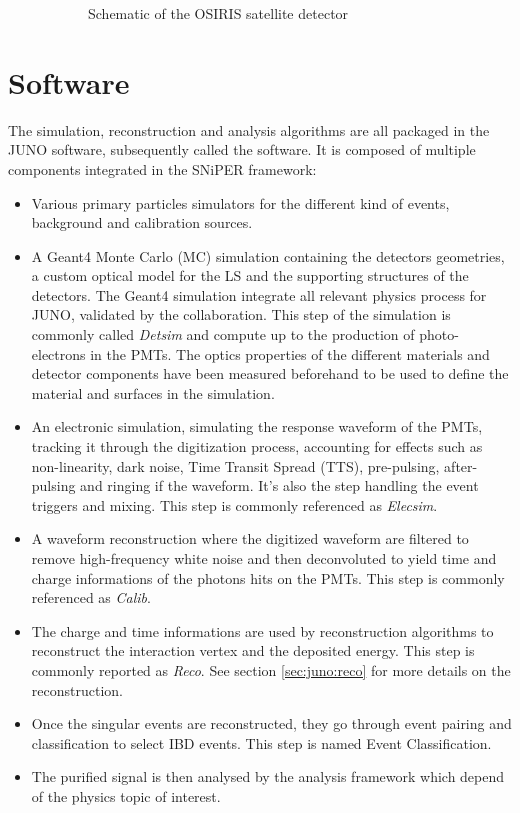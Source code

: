 \documentclass[../main.tex]{subfiles}
\begin{document}
\begin{figure}[ht]
\begin{subfigure}[t]{0.49\linewidth}
    \caption{Schematic of the OSIRIS satellite detector}
    \label{fig:juno:osiris}
  \end{subfigure}
  \caption{}
\end{figure}

\section{Software}
\label{sec:juno:software}

The simulation, reconstruction and analysis algorithms are all packaged in the JUNO software, subsequently called the software.
It is composed of multiple components integrated in the SNiPER \cite{lin_application_2017} framework:

\begin{itemize}
  \item Various primary particles simulators for the different kind of events, background and calibration sources.
  \item A Geant4 \cite{agostinelli_geant4simulation_2003, allison_geant4_2006, allison_recent_2016} Monte Carlo (MC) simulation containing the detectors geometries, a custom optical model for the LS and the supporting structures of the detectors. The Geant4 simulation integrate all relevant physics process for JUNO, validated by the collaboration. This step of the simulation is commonly called \textit{Detsim} and compute up to the production of photo-electrons in the PMTs. The optics properties of the different materials and detector components have been measured beforehand to be used to define the material and surfaces in the simulation.
  \item An electronic simulation, simulating the response waveform of the PMTs, tracking it through the digitization process, accounting for effects such as non-linearity, dark noise, Time Transit Spread (TTS), pre-pulsing, after-pulsing and ringing if the waveform. It's also the step handling the event triggers and mixing. This step is commonly referenced as \textit{Elecsim}.
  \item A waveform reconstruction where the digitized waveform are filtered to remove high-frequency white noise and then deconvoluted to yield time and charge informations of the photons hits on the PMTs. This step is commonly referenced as \textit{Calib}.
  \item The charge and time informations are used by reconstruction algorithms to reconstruct the interaction vertex and the deposited energy. This step is commonly reported as \textit{Reco}. See section \ref{sec:juno:reco} for more details on the reconstruction.
  \item Once the singular events are reconstructed, they go through event pairing and classification to select IBD events. This step is named Event Classification.
  \item The purified signal is then analysed by the analysis framework which depend of the physics topic of interest.
\end{itemize}
\end{document}

